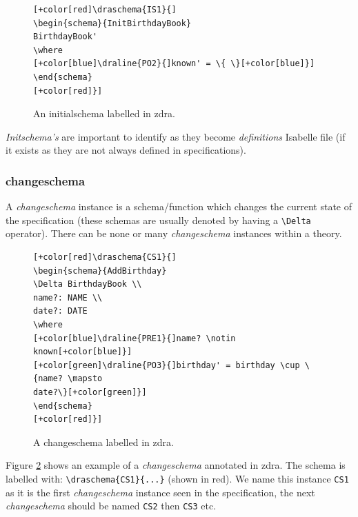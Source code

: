 \begin{figure}[H]
\centering
\begin{footnotesize}
\begin{BVerbatim}[commandchars=+\[\]]
[+color[red]\draschema{IS1}{]
\begin{schema}{InitBirthdayBook} 
BirthdayBook' 
\where 
[+color[blue]\draline{PO2}{]known' = \{ \}[+color[blue]}]
\end{schema}
[+color[red]}]
\end{BVerbatim}
\caption{\label{fig:exampleofis} An initialschema labelled in \gls{zdra}.}
\end{footnotesize}
\end{figure}

\emph{Initschema's} are important to identify as they become \emph{definitions}
Isabelle file (if it exists as they are not always defined in specifications).

\subsubsection{changeschema}

A \emph{changeschema} instance is a schema/function which changes the current
state of the specification (these schemas are usually denoted by having a
\verb|\Delta| operator). There can be none or many \emph{changeschema} instances
within a theory.

\begin{center}
\begin{figure}[H]
\centering
\begin{footnotesize}
\begin{BVerbatim}[commandchars=+\[\]]
[+color[red]\draschema{CS1}{]
\begin{schema}{AddBirthday}
\Delta BirthdayBook \\
name?: NAME \\
date?: DATE
\where
[+color[blue]\draline{PRE1}{]name? \notin known[+color[blue]}]
[+color[green]\draline{PO3}{]birthday' = birthday \cup \{name? \mapsto
date?\}[+color[green]}]
\end{schema}
[+color[red]}]
\end{BVerbatim}
\end{footnotesize}
\caption{\label{fig:exampleofcs} A changeschema labelled in \gls{zdra}.}
\end{figure}
\end{center}

Figure \ref{fig:exampleofcs} shows an example of a \emph{changeschema} annotated
in \gls{zdra}. The schema is labelled with: \verb|\draschema{CS1}{...}| (shown
in red). We name this instance \verb|CS1| as it is the first \emph{changeschema}
instance seen in the specification, the next \emph{changeschema} should be named
\verb|CS2| then \verb|CS3| etc.

